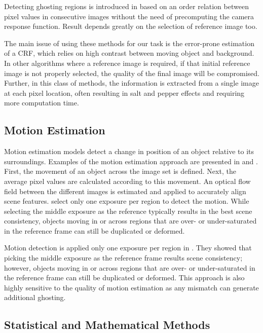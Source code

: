 \documentclass[preprint,12pt,3p]{elsarticle}
\begin{document}
 Detecting ghosting regions is introduced in \cite{sidibe2009ghost} based on an order relation between pixel values in consecutive images without the need of precomputing the camera response function. Result depends greatly on the selection of reference image too.
 
 The main issue of using these methods for our task is the error-prone estimation of a CRF, which relies on high contrast between moving object and background. In other algorithms where a reference image is required, if that initial reference image is not properly selected, the quality of the final image will be compromised. Further, in this class of methods, the information is extracted from a single image at each pixel location, often resulting in salt and pepper effects and requiring more computation time.
    
  \subsection{Motion Estimation}
  \label{subsub2}

Motion estimation models detect a change in position of an object relative to its surroundings. 
Examples  of the motion estimation approach are presented in \cite{7} and \cite{8}. First, the movement of an object across the image set  is defined.  Next, the  average pixel values are calculated according to this movement. An optical flow field between the different images is estimated and applied to accurately align scene features. \cite{8} select only one exposure per region to detect the motion. While selecting the middle exposure as the reference typically results in the best scene consistency, objects moving in or across regions that are over- or under-saturated in the reference frame can still be duplicated or deformed.

Motion detection is applied only one exposure per region in \cite{8}. They showed that picking the middle exposure as the reference frame results scene consistency; however, objects moving in or across regions that are over- or under-saturated in the reference frame can still be duplicated or deformed. This approach is also highly sensitive to the quality of motion estimation as any mismatch can generate additional ghosting. 



  
 \subsection{Statistical and Mathematical Methods}
 \label{subsub3}
 
\end{document}
